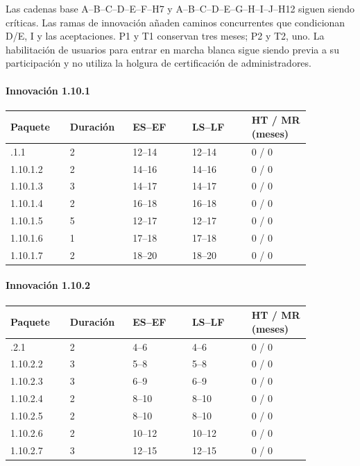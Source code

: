 Las cadenas base A–B–C–D–E–F–H7 y A–B–C–D–E–G–H–I–J–H12 siguen siendo críticas. Las ramas de innovación añaden caminos concurrentes que condicionan D/E, I y las aceptaciones. P1 y T1 conservan tres meses; P2 y T2, uno. La habilitación de usuarios para entrar en marcha blanca sigue siendo previa a su participación y no utiliza la holgura de certificación de administradores.

\paragraph{Innovación 1.10.1}

\begin{longtable}{@{}p{0.171\linewidth}p{0.171\linewidth}p{0.171\linewidth}p{0.171\linewidth}p{0.171\linewidth}@{}}
\toprule
\textbf{Paquete} & \textbf{Duración} & \textbf{ES–EF} & \textbf{LS–LF} & \textbf{HT / MR (meses)} \\
\midrule
\endhead
\bottomrule
\endlastfoot
1.10.1.1 & 2 & 12–14 & 12–14 & 0 / 0 \\
1.10.1.2 & 2 & 14–16 & 14–16 & 0 / 0 \\
1.10.1.3 & 3 & 14–17 & 14–17 & 0 / 0 \\
1.10.1.4 & 2 & 16–18 & 16–18 & 0 / 0 \\
1.10.1.5 & 5 & 12–17 & 12–17 & 0 / 0 \\
1.10.1.6 & 1 & 17–18 & 17–18 & 0 / 0 \\
1.10.1.7 & 2 & 18–20 & 18–20 & 0 / 0 \\
\end{longtable}

\paragraph{Innovación 1.10.2}

\begin{longtable}{@{}p{0.171\linewidth}p{0.171\linewidth}p{0.171\linewidth}p{0.171\linewidth}p{0.171\linewidth}@{}}
\toprule
\textbf{Paquete} & \textbf{Duración} & \textbf{ES–EF} & \textbf{LS–LF} & \textbf{HT / MR (meses)} \\
\midrule
\endhead
\bottomrule
\endlastfoot
1.10.2.1 & 2 & 4–6 & 4–6 & 0 / 0 \\
1.10.2.2 & 3 & 5–8 & 5–8 & 0 / 0 \\
1.10.2.3 & 3 & 6–9 & 6–9 & 0 / 0 \\
1.10.2.4 & 2 & 8–10 & 8–10 & 0 / 0 \\
1.10.2.5 & 2 & 8–10 & 8–10 & 0 / 0 \\
1.10.2.6 & 2 & 10–12 & 10–12 & 0 / 0 \\
1.10.2.7 & 3 & 12–15 & 12–15 & 0 / 0 \\
\end{longtable}

